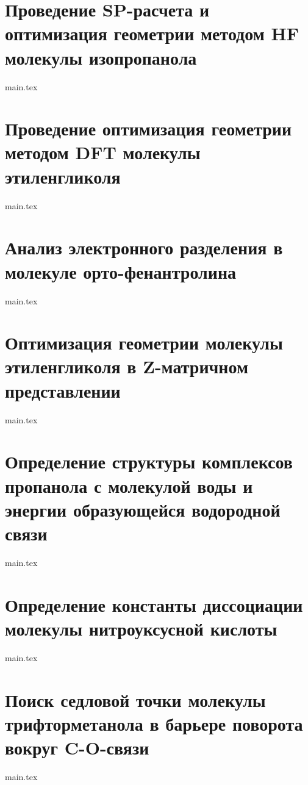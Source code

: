 \documentclass[12pt,a4paper]{article}
\begin{document}




\section{Проведение SP-расчета и оптимизация геометрии методом HF молекулы изопропанола}
{main.tex}

\newpage
\section{Проведение оптимизация геометрии методом DFT молекулы этиленгликоля}
{main.tex}

\newpage
\section{Анализ электронного разделения в молекуле орто-фенантролина}
{main.tex}

\newpage
\section{Оптимизация геометрии молекулы этиленгликоля в Z-матричном представлении}
{main.tex}

\newpage
\section{Определение структуры комплексов пропанола с молекулой воды и энергии образующейся водородной связи}
{main.tex}

\newpage
\section{Определение константы диссоциации молекулы нитроуксусной кислоты}
{main.tex}

\newpage
\section{Поиск седловой точки молекулы трифторметанола в барьере поворота вокруг C-O-связи}
{main.tex}
\end{document}
